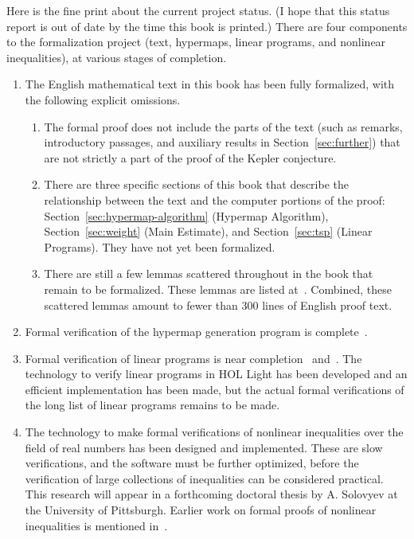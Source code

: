 Here is the fine print about the current project status. (I hope that
this status report is out of date by the time this book is printed.)
There are four components to the formalization project (text, hypermaps, linear programs,
and nonlinear inequalities), at various stages of completion.
\begin{enumerate}
\item
The English mathematical text in this book has been fully
  formalized, with the following explicit omissions.
\begin{enumerate}
\item The formal proof does not include the parts of the text (such
  as remarks, introductory passages, and auxiliary results in 
  Section~\ref{sec:further}) that are
  not strictly a part of the proof of the Kepler conjecture.
\item There are three specific sections of this book that describe
  the relationship between the text and the computer portions of
  the proof: Section~\ref{sec:hypermap-algorithm} (Hypermap Algorithm), 
  Section~\ref{sec:weight} (Main Estimate), and Section~\ref{sec:tsp} (Linear Programs).
  They have not yet been formalized.
\item There are still a few lemmas scattered throughout in the book that remain to be formalized.
These lemmas are listed at~\cite{website:FlyspeckProject}.
Combined, these scattered lemmas amount to fewer than 300 lines of English proof text.
\end{enumerate}
\item Formal verification of the hypermap generation program is complete~\cite{Nipkow:2005:Tame}.
\item Formal verification of linear programs is near 
completion~\cite{Obua:2005:Thesis} and~\cite{Solovyev:LP}.
 The technology to verify linear programs in HOL Light has been developed and 
  an efficient implementation has been made, but the actual formal verifications of the
  long list of linear programs remains to be made.
\item The technology to make formal verifications of nonlinear inequalities over the
field of real numbers has been designed and implemented.   These are slow verifications,
and the software must be further optimized, before the verification of large collections
of inequalities can be considered practical.  This research will appear in a forthcoming doctoral 
thesis by A. Solovyev
at the University of Pittsburgh.  Earlier work on formal proofs of nonlinear inequalities
is mentioned in~\cite{HHMNOZ}.
\end{enumerate}


